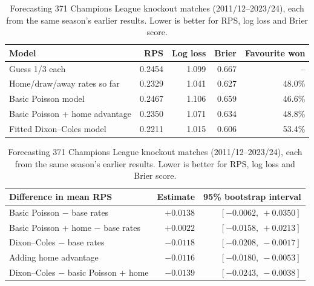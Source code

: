 \begin{table}[t]
\centering\small
\caption{Forecasting 371 Champions League knockout matches (2011/12--2023/24), each from the same season's earlier results. Lower is better for RPS, log loss and Brier score.}
\label{tab:modelcheck}
\begin{tabular}{lrrrr}
\toprule
Model & RPS & Log loss & Brier & Favourite won \\
\midrule
Guess 1/3 each & 0.2454 & 1.099 & 0.667 & -- \\
Home/draw/away rates so far & 0.2329 & 1.041 & 0.627 & 48.0\% \\
Basic Poisson model & 0.2467 & 1.106 & 0.659 & 46.6\% \\
Basic Poisson + home advantage & 0.2350 & 1.071 & 0.634 & 48.8\% \\
Fitted Dixon--Coles model & 0.2211 & 1.015 & 0.606 & 53.4\% \\
\bottomrule
\end{tabular}

\vspace{8pt}
\begin{tabular}{lrr}
\toprule
Difference in mean RPS & Estimate & 95\% bootstrap interval \\
\midrule
Basic Poisson $-$ base rates & $+0.0138$ & $[-0.0062,\ +0.0350]$ \\
Basic Poisson + home $-$ base rates & $+0.0022$ & $[-0.0158,\ +0.0213]$ \\
Dixon--Coles $-$ base rates & $-0.0118$ & $[-0.0208,\ -0.0017]$ \\
Adding home advantage & $-0.0116$ & $[-0.0180,\ -0.0053]$ \\
Dixon--Coles $-$ basic Poisson + home & $-0.0139$ & $[-0.0243,\ -0.0038]$ \\
\bottomrule
\end{tabular}
\end{table}
